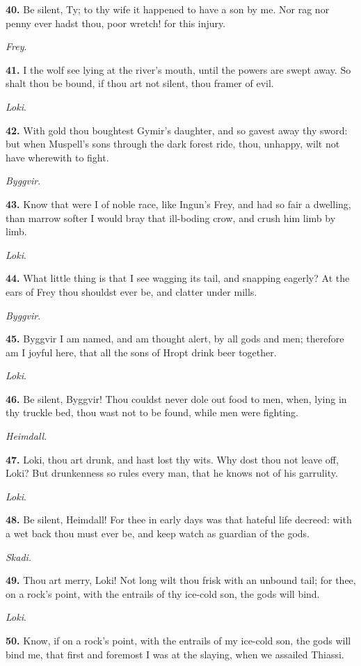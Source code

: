 \textbf{40.} Be silent, Ty; to thy wife it happened to have a son by me. Nor
rag nor penny ever hadst thou, poor wretch! for this injury.

\emph{Frey}.

\textbf{41.} I the wolf see lying at the river's mouth, until the powers are
swept away. So shalt thou be bound, if thou art not silent, thou
framer of evil.

\emph{Loki}.

\textbf{42.} With gold thou boughtest Gymir's daughter, and so gavest away
thy sword: but when Muspell's sons through the dark forest ride, thou,
unhappy, wilt not have wherewith to fight.

\emph{Byggvir}.

\textbf{43.} Know that were I of noble race, like Ingun's Frey, and had so
fair a dwelling, than marrow softer I would bray that ill-boding crow,
and crush him limb by limb.

\emph{Loki}.

\textbf{44.} What little thing is that I see wagging its tail, and snapping
eagerly? At the ears of Frey thou shouldst ever be, and clatter under
mills.

\emph{Byggvir}.

\textbf{45.} Byggvir I am named, and am thought alert, by all gods and men;
therefore am I joyful here, that all the sons of Hropt drink beer
together.

\emph{Loki}.

\textbf{46.} Be silent, Byggvir! Thou couldst never dole out food to men,
when, lying in thy truckle bed, thou wast not to be found, while men
were fighting.

\emph{Heimdall}.

\textbf{47.} Loki, thou art drunk, and hast lost thy wits. Why dost thou not
leave off, Loki? But drunkenness so rules every man, that he knows not
of his garrulity.

\emph{Loki}.

\textbf{48.} Be silent, Heimdall! For thee in early days was that hateful
life decreed: with a wet back thou must ever be, and keep watch as
guardian of the gods.

\emph{Skadi}.

\textbf{49.} Thou art merry, Loki! Not long wilt thou frisk with an unbound
tail; for thee, on a rock's point, with the entrails of thy ice-cold
son, the gods will bind.

\emph{Loki}.

\textbf{50.} Know, if on a rock's point, with the entrails of my ice-cold
son, the gods will bind me, that first and foremost I was at the
slaying, when we assailed Thiassi.


